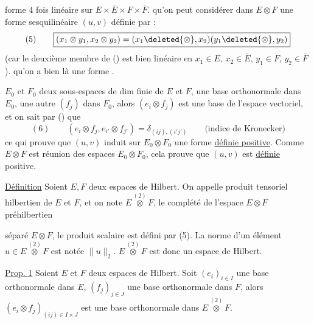 forme $4$ fois linéaire sur $E\times\overline E\times F\times\overline F$.
  qu'on peut considérer dans $E\otimes F$  une forme sesquilinéaire $(u,v)$ définie par  :
\[
(5)\qquad\boxed{(x_1\otimes y_1,x_2\otimes y_2)=(x_1\deleted{\otimes},x_2)(y_1\deleted{\otimes},y_2)}
\]
(car le deuxième membre de () est bien linéaire en $x_1\in E$, $x_2\in\overline E$, $y_1\in F$, $y_2\in\overline F$).
  qu'on a bien là une forme .

  $E_0$ et $F_0$  deux sous-espaces de dim finie de $E$ et $F$,   une base orthonormale  dans $E_0$, une autre $(f_j)$ dans $F_0$,
alors $(e_i\otimes f_j)$ est une base de l'espace vectoriel, et on sait par () que
\[
(6)\qquad(e_i\otimes f_j,e_{i'}\otimes f_{j'})=\delta_{(ij),(i'j')}\qquad\text{(indice de Kronecker)}
\]
ce qui prouve que $(u,v)$ induit sur $E_0\otimes F_0$ une forme \uline{définie positive}.
Comme $E\otimes F$ est réunion des espaces $E_0\otimes F_0$, cela prouve que $(u,v)$ est \uline{définie} positive.

\uline{Définition} Soient $E,F$ deux espaces de Hilbert. On appelle produit tensoriel hilbertien de $E$ et $F$, et on note $E\overset{(2)}{\otimes}F$, le complété de l'espace  $E\otimes F$ préhilbertien

séparé $E\otimes F$,   le produit scalaire est défini par (5).
La norme d'un élément  $u\in E\overset{(2)}\otimes F$ est notée $\|u\|_2$.
$E\overset{(2)}\otimes F$ est donc un espace de Hilbert.

\uline{Prop. 1} Soient $E$ et $F$ deux espaces de Hilbert. 
Soit $(e_i)_{i\in I}$ une base orthonormale dans $E$, $(f_j)_{j\in J}$ une base orthonormale dans $F$, alors $(e_i\otimes f_j)_{(ij)\in I\times J}$ est une base orthonormale dans $E\overset{(2)}\otimes F$.

